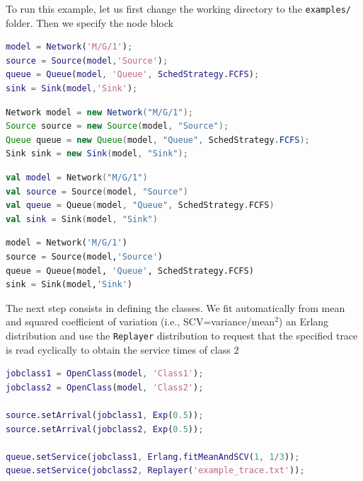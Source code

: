 To run this example, let us first change the working directory to the \texttt{examples/} folder. Then we specify the node block
\begin{MATLAB}
\begin{lstlisting}[language = matlab]
model = Network('M/G/1');
source = Source(model,'Source');
queue = Queue(model, 'Queue', SchedStrategy.FCFS);
sink = Sink(model,'Sink');
\end{lstlisting}
\end{MATLAB}
\begin{JAVA}
\begin{lstlisting}[language = java, basicstyle=\ttfamily\scriptsize]
Network model = new Network("M/G/1");
Source source = new Source(model, "Source");
Queue queue = new Queue(model, "Queue", SchedStrategy.FCFS);
Sink sink = new Sink(model, "Sink");
\end{lstlisting}
\end{JAVA}
\begin{KOTLIN}
\begin{lstlisting}[language = kotlin, basicstyle=\ttfamily\scriptsize]
val model = Network("M/G/1")
val source = Source(model, "Source")
val queue = Queue(model, "Queue", SchedStrategy.FCFS)
val sink = Sink(model, "Sink")
\end{lstlisting}
\end{KOTLIN}
\begin{PYTHON}
\begin{lstlisting}[language = python]
model = Network('M/G/1')
source = Source(model,'Source')
queue = Queue(model, 'Queue', SchedStrategy.FCFS)
sink = Sink(model,'Sink')
\end{lstlisting}
\end{PYTHON}
The next step consists in defining the classes. We fit automatically from mean and squared coefficient of variation (i.e.,  SCV=variance/mean$^2$) an Erlang distribution and use the \texttt{Replayer} distribution to request that the specified trace is read cyclically to obtain the service times of class 2
\begin{MATLAB}
\begin{lstlisting}[language = matlab]
jobclass1 = OpenClass(model, 'Class1');
jobclass2 = OpenClass(model, 'Class2');

source.setArrival(jobclass1, Exp(0.5));
source.setArrival(jobclass2, Exp(0.5));

queue.setService(jobclass1, Erlang.fitMeanAndSCV(1, 1/3));
queue.setService(jobclass2, Replayer('example_trace.txt'));
\end{lstlisting}
\end{MATLAB}
